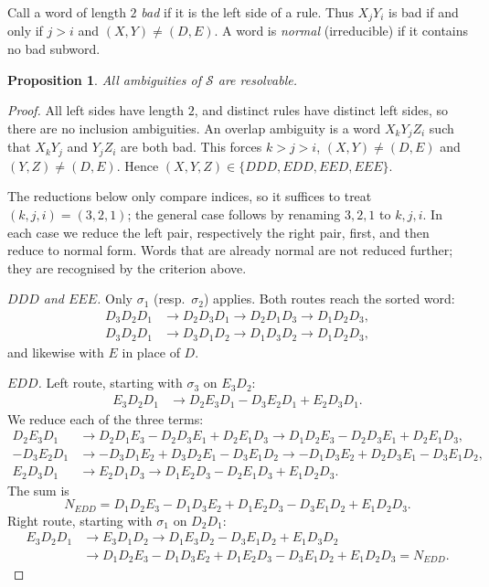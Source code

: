 \documentclass[11pt]{amsart}
\newtheorem{proposition}[theorem]{Proposition}
\theoremstyle{definition}
\theoremstyle{remark}
\begin{document}
Call a word of length $2$ \emph{bad} if it is the left side of a rule. Thus $X_jY_i$ is bad if and only if $j>i$ and $(X,Y)\neq(D,E)$. A word is \emph{normal} (irreducible) if it contains no bad subword.

\begin{proposition}\label{prop:ambig}
All ambiguities of $\mathcal S$ are resolvable.
\end{proposition}

\begin{proof}
All left sides have length $2$, and distinct rules have distinct left sides, so there are no inclusion ambiguities. An overlap ambiguity is a word $X_kY_jZ_i$ such that $X_kY_j$ and $Y_jZ_i$ are both bad. This forces $k>j>i$, $(X,Y)\neq(D,E)$ and $(Y,Z)\neq(D,E)$. Hence $(X,Y,Z)\in\{DDD,EDD,EED,EEE\}$.

The reductions below only compare indices, so it suffices to treat $(k,j,i)=(3,2,1)$; the general case follows by renaming $3,2,1$ to $k,j,i$. In each case we reduce the left pair, respectively the right pair, first, and then reduce to normal form. Words that are already normal are not reduced further; they are recognised by the criterion above.

\emph{$DDD$ and $EEE$.} Only $\sigma_1$ (resp.\ $\sigma_2$) applies. Both routes reach the sorted word:
\begin{align*}
D_3D_2D_1&\to D_2D_3D_1\to D_2D_1D_3\to D_1D_2D_3,\\
D_3D_2D_1&\to D_3D_1D_2\to D_1D_3D_2\to D_1D_2D_3,
\end{align*}
and likewise with $E$ in place of $D$.

\emph{$EDD$.} Left route, starting with $\sigma_3$ on $E_3D_2$:
\begin{align*}
E_3D_2D_1&\to D_2E_3D_1-D_3E_2D_1+E_2D_3D_1.
\end{align*}
We reduce each of the three terms:
\begin{align*}
D_2E_3D_1&\to D_2D_1E_3-D_2D_3E_1+D_2E_1D_3\to D_1D_2E_3-D_2D_3E_1+D_2E_1D_3,\\
-D_3E_2D_1&\to -D_3D_1E_2+D_3D_2E_1-D_3E_1D_2\to -D_1D_3E_2+D_2D_3E_1-D_3E_1D_2,\\
E_2D_3D_1&\to E_2D_1D_3\to D_1E_2D_3-D_2E_1D_3+E_1D_2D_3.
\end{align*}
The sum is
\[
N_{EDD}=D_1D_2E_3-D_1D_3E_2+D_1E_2D_3-D_3E_1D_2+E_1D_2D_3 .
\]
Right route, starting with $\sigma_1$ on $D_2D_1$:
\begin{align*}
E_3D_2D_1&\to E_3D_1D_2\to D_1E_3D_2-D_3E_1D_2+E_1D_3D_2\\
&\to D_1D_2E_3-D_1D_3E_2+D_1E_2D_3-D_3E_1D_2+E_1D_2D_3=N_{EDD}.
\end{align*}


\end{proof}
\end{document}

